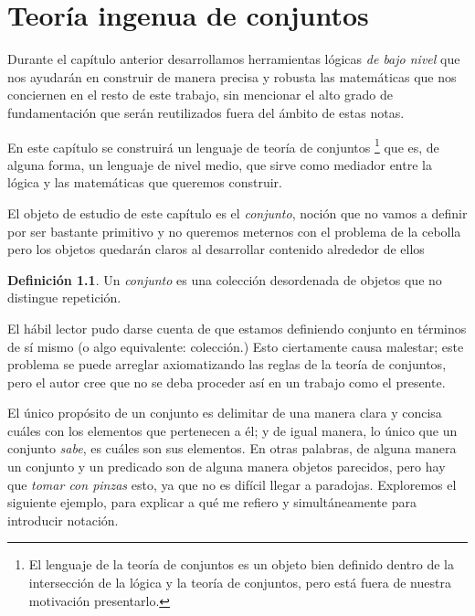\documentclass{book}
\theoremstyle{definition}
\newtheorem{df}{Definición}[chapter]
\begin{document}

\chapter{Teoría ingenua de conjuntos}
Durante el capítulo anterior desarrollamos herramientas lógicas \emph{de bajo nivel} que nos ayudarán en construir de manera precisa y robusta las matemáticas que nos conciernen en el resto de este trabajo, sin mencionar el alto grado de fundamentación que serán reutilizados fuera del ámbito de estas notas.

En este capítulo se construirá un lenguaje de teoría de conjuntos
\footnote{El lenguaje de la teoría de conjuntos es un objeto bien definido dentro de la intersección de la lógica y la teoría de conjuntos, pero está fuera de nuestra motivación presentarlo. %
}
que es, de alguna forma, un lenguaje de nivel medio, que sirve como mediador entre la lógica y las matemáticas que queremos construir.

El objeto de estudio de este capítulo es el \emph{conjunto}, noción que no vamos a definir por ser bastante primitivo y no queremos meternos con el problema de la cebolla %
pero los objetos quedarán claros al desarrollar contenido alrededor de ellos

\begin{df} %
	Un \emph{conjunto} es una colección desordenada de objetos que no distingue repetición.
\end{df}

El hábil lector pudo darse cuenta de que estamos definiendo conjunto en términos de sí mismo (o algo equivalente: colección.) Esto ciertamente causa malestar; este problema se puede arreglar axiomatizando las reglas de la teoría de conjuntos, pero el autor cree que no se deba proceder así en un trabajo como el presente.   %

El único propósito de un conjunto es delimitar de una manera clara y concisa cuáles con los elementos que pertenecen a él; y de igual manera, lo único que un conjunto \emph{sabe}, es cuáles son sus elementos.
En otras palabras, de alguna manera un conjunto y un predicado son de alguna manera objetos parecidos, pero hay que \emph{tomar con pinzas} esto, ya que no es difícil llegar a paradojas.
Exploremos el siguiente ejemplo, para explicar a qué me refiero y simultáneamente para introducir notación.
\end{document}
